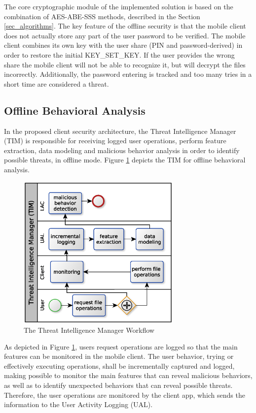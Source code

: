 \documentclass[twocolumn]{svjour3}          	%
\begin{document}
The core cryptographic module of the implemented solution is based on the combination of AES-ABE-SSS methods, described in the Section \ref{sec_algorithms}. The key feature of the offline security is that the mobile client does not actually store any part of the user password to be verified. The mobile client combines its own key with the user share (PIN and password-derived) in order to restore the initial KEY\_SET\_KEY. If the user provides the wrong share the mobile client will not be able to recognize it, but will decrypt the files incorrectly. Additionally, the password entering is tracked and too many tries in a short time are considered a threat.

\subsection{Offline Behavioral Analysis}
\label{sec_offline_behavioral_analysis}

In the proposed client security architecture, the Threat Intelligence Manager (TIM) is responsible for receiving logged user operations, perform feature extraction, data modeling and malicious behavior analysis in order to identify possible threats, in offline mode. Figure \ref{fig:06} depicts the TIM for offline behavioral analysis. 

\begin{figure}[h!]
	\centering
	\includegraphics[width=8cm]{fig06.eps}
	\caption{The Threat Intelligence Manager Workflow}
	\label{fig:06}
\end{figure}

As depicted in Figure \ref{fig:06}, users request operations are logged so that the main features can be monitored in the mobile client. The user behavior, trying or effectively executing operations, shall be incrementally captured and logged, making possible to monitor the main features that can reveal malicious behaviors, as well as to identify unexpected behaviors that can reveal possible threats. Therefore, the user operations are monitored by the client app, which sends the information to the User Activity Logging (UAL). 
\end{document}

